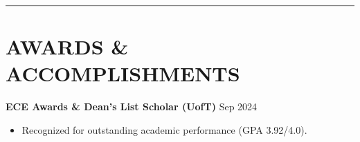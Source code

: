 \documentclass[a4paper,10pt]{article}
\begin{document}
\noindent\rule{\linewidth}{1pt}

\section*{\textbf{AWARDS \& ACCOMPLISHMENTS}}

\noindent\textbf{ECE Awards \& Dean's List Scholar (UofT)} \hfill Sep 2024
\begin{itemize}[leftmargin=0.2in]
    \item Recognized for outstanding academic performance (GPA 3.92/4.0).
\end{itemize}
\end{document}
